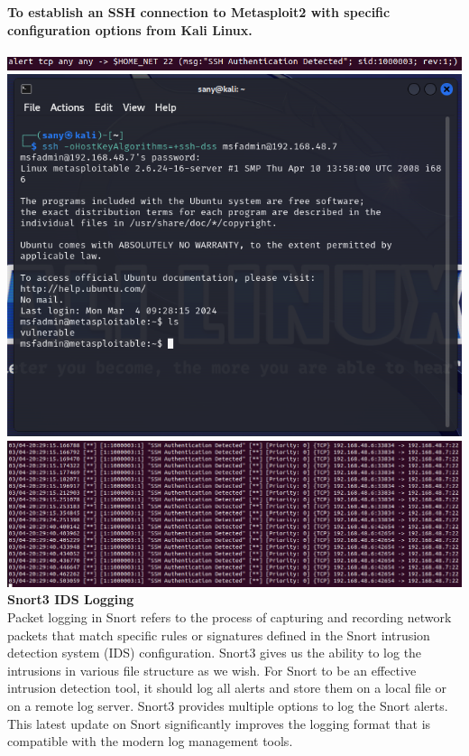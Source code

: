 \documentclass{article}
\begin{document}
\clearpage
\textbf{To establish an SSH connection to Metasploit2 with specific configuration options from Kali Linux.}\\\\
\includegraphics[width=1.0\textwidth]{images/ssh1.PNG}
\includegraphics[width=1.0\textwidth,height=0.4\textheight]{images/ssh2.PNG}
\includegraphics[width=1.0\textwidth,height=0.4\textheight]{images/ssh3.PNG}
\clearpage
\textbf{\hspace{-\3.5cm}Snort3 IDS Logging}\\
Packet logging in Snort refers to the process of capturing and recording network packets that match specific rules or signatures defined in the Snort intrusion detection system (IDS) configuration. Snort3 gives us the ability to log the intrusions in various file structure as we wish. For Snort to be an effective intrusion detection tool, it should log all alerts and store them on a local file or on a remote log server. Snort3 provides multiple options to log the Snort alerts. This latest update on Snort significantly improves the logging format that is compatible with the modern log management tools.\\\\
\end{document}
